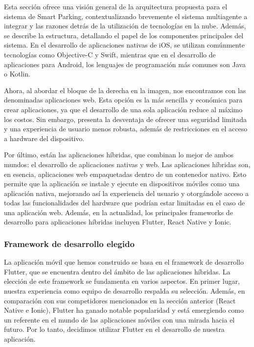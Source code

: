 Esta sección ofrece una visión general de la arquitectura propuesta para el sistema de Smart Parking, contextualizando brevemente el sistema multiagente a integrar y las razones detrás de la utilización de tecnologías en la nube. Además, se describe la estructura, detallando el papel de los componentes principales del sistema. En el desarrollo de aplicaciones nativas de iOS, se utilizan comúnmente tecnologías como Objective-C y Swift, mientras que en el desarrollo de aplicaciones para Android, los lenguajes de programación más comunes son Java o Kotlin.

Ahora, al abordar el bloque de la derecha en la imagen, nos encontramos con las denominadas aplicaciones web. Esta opción es la más sencilla y económica para crear aplicaciones, ya que el desarrollo de una sola aplicación reduce al máximo los costos. Sin embargo, presenta la desventaja de ofrecer una seguridad limitada y una experiencia de usuario menos robusta, además de restricciones en el acceso a hardware del dispositivo.

Por último, están las aplicaciones híbridas, que combinan lo mejor de ambos mundos: el desarrollo de aplicaciones nativas y web. Las aplicaciones híbridas son, en esencia, aplicaciones web empaquetadas dentro de un contenedor nativo. Esto permite que la aplicación se instale y ejecute en dispositivos móviles como una aplicación nativa, mejorando así la experiencia del usuario y otorgándole acceso a todas las funcionalidades del hardware que podrían estar limitadas en el caso de una aplicación web. Además, en la actualidad, los principales frameworks de desarrollo para aplicaciones híbridas incluyen Flutter, React Native y Ionic.


\subsubsection{Framework de desarrollo elegido}
La aplicación móvil que hemos construido se basa en el framework de desarrollo Flutter, que se encuentra dentro del ámbito de las aplicaciones híbridas. La elección de este framework se fundamenta en varios aspectos. En primer lugar, nuestra experiencia como equipo de desarrollo respalda su selección. Además, en comparación con sus competidores mencionados en la sección anterior (React Native e Ionic), Flutter ha ganado notable popularidad y está emergiendo como un referente en el mundo de las aplicaciones móviles con una mirada hacia el futuro. Por lo tanto, decidimos utilizar Flutter en el desarrollo de nuestra aplicación.

